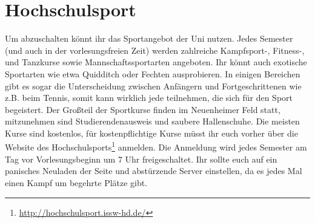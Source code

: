 \section{Hochschulsport}
Um abzuschalten könnt ihr das Sportangebot der Uni nutzen. Jedes Semester (und auch in der vorlesungsfreien Zeit) werden zahlreiche Kampfsport-, Fitness-, und Tanzkurse sowie Mannschaftssportarten angeboten. Ihr könnt auch exotische Sportarten wie etwa Quidditch oder Fechten ausprobieren. In einigen Bereichen gibt es sogar die Unterscheidung zwischen Anfängern und Fortgeschrittenen wie z.B. beim Tennis, somit kann wirklich jede teilnehmen, die sich für den Sport begeistert.
Der Großteil der Sportkurse finden im Neuenheimer Feld statt, mitzunehmen sind Studierendenausweis und saubere Hallenschuhe.
Die meisten Kurse sind kostenlos, für kostenpflichtige Kurse müsst ihr euch vorher über die Website des Hochschulsports\footnote{\url{http://hochschulsport.issw-hd.de/}} anmelden. Die Anmeldung wird jedes Semester am Tag vor Vorlesungsbeginn um 7 Uhr freigeschaltet. Ihr sollte euch auf ein panisches Neuladen der Seite und abstürzende Server einstellen, da es jedes Mal einen Kampf um begehrte Plätze gibt.

